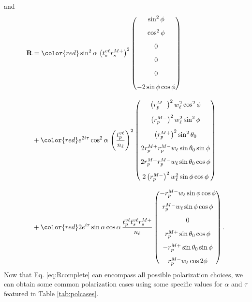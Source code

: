 \documentclass[aps,pra,10pt,amsmath,notitlepage,letterpaper]{revtex4-1}
\begin{document}
and
\begin{equation}\label{eq:Rcomplete}
\begin{split}
\mathbf{R}
&=
{\color{red}\sin^{2}\alpha}\,
\left(t^{v\ell}_{s}r^{M+}_{s}\right)^{2}
\begin{pmatrix}
\sin^{2}\phi        \\[8pt]
\cos^{2}\phi        \\[8pt]
0                   \\[8pt]
0                   \\[8pt]
0                   \\[8pt]
- 2\sin\phi\cos\phi 
\end{pmatrix}\\[8pt]
&+
{\color{red}e^{2i\tau}\cos^{2}\alpha}\,
\left(\frac{t^{v\ell}_{p}}{n_{\ell}}\right)^{2}
\begin{pmatrix}
\left(r^{M-}_{p}\right)^{2}w^{2}_{\ell}\cos^{2}\phi       \\[8pt]    
\left(r^{M-}_{p}\right)^{2}w^{2}_{\ell}\sin^{2}\phi       \\[8pt]
\left(r^{M+}_{p}\right)^{2}\sin^{2}\theta_{0}             \\[8pt]
2r^{M+}_{p}r^{M-}_{p}w_{\ell}\sin\theta_{0}\sin\phi       \\[8pt]
2r^{M+}_{p}r^{M-}_{p}w_{\ell}\sin\theta_{0}\cos\phi       \\[8pt]
2\left(r^{M-}_{p}\right)^{2}w^{2}_{\ell}\sin\phi\cos\phi  
\end{pmatrix}\\[8pt]
&+
{\color{red}2e^{i\tau}\sin\alpha\cos\alpha}\,
\frac{t^{v\ell}_{p}t^{v\ell}_{s}r^{M+}_{s}}{n_{\ell}}
\begin{pmatrix}
-r^{M-}_{p}w_{\ell}\sin\phi\cos\phi \\[8pt]
r^{M-}_{p}w_{\ell}\sin\phi\cos\phi  \\[8pt]
0                                   \\[8pt]
r^{M+}_{p}\sin\theta_{0}\cos\phi    \\[8pt]
-r^{M+}_{p}\sin\theta_{0}\sin\phi   \\[8pt]
r^{M-}_{p}w_{\ell}\cos 2\phi        
\end{pmatrix}.
\end{split}
\end{equation}
Now that Eq. \eqref{eq:Rcomplete} can encompass all possible polarization
choices, we can obtain some common polarization cases using some specific values
for $\alpha$ and $\tau$ featured in Table \ref{tab:polcases}.
\end{document}
